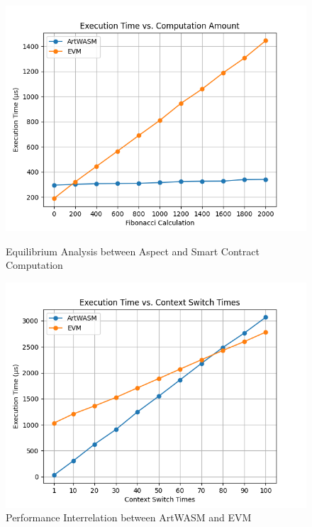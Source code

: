 \begin{figure}[htp]
  \centering
  \begin{minipage}{0.3\textwidth}
    \centering
    \includegraphics[width=1\linewidth]{sections/tx-latency-et-vs-cc.png}
    \caption{Equilibrium Analysis between Aspect and Smart Contract Computation}
    \label{fig:image1}
  \end{minipage}\hfill
  \begin{minipage}{0.3\textwidth}
    \centering
    \includegraphics[width=1\linewidth]{sections/tx-latency-et-vs-jpc.png}
    \caption{Performance Interrelation between ArtWASM and EVM}
    \label{fig:image2}
  \end{minipage}\hfill
  \begin{minipage}{0.3\textwidth}

\end{minipage}
\end{figure}
